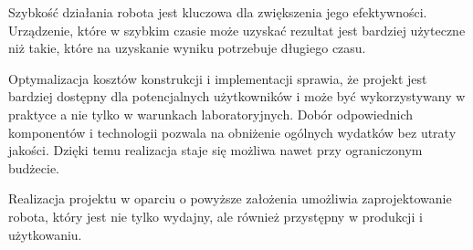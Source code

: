 Szybkość działania robota jest kluczowa dla zwiększenia jego efektywności.
Urządzenie, które w szybkim czasie może uzyskać rezultat jest bardziej użyteczne niż
takie, które na uzyskanie wyniku potrzebuje długiego czasu. 

Optymalizacja kosztów konstrukcji i implementacji sprawia, że projekt jest bardziej dostępny dla potencjalnych użytkowników i może być wykorzystywany w praktyce a nie tylko w warunkach laboratoryjnych. 
Dobór odpowiednich komponentów i technologii pozwala na obniżenie ogólnych wydatków bez utraty jakości.
Dzięki temu realizacja staje się możliwa nawet przy ograniczonym budżecie.

Realizacja projektu w oparciu o powyższe założenia umożliwia zaprojektowanie robota, który jest nie tylko 
wydajny, ale również przystępny w produkcji i użytkowaniu.
